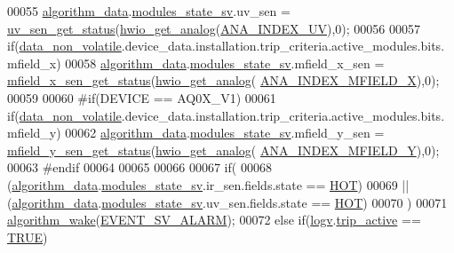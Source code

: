 \begin{DoxyCode}
00055           \hyperlink{a00016_a183caa40cd01e79ee309cc9c4a225197}{algorithm\_data}.\hyperlink{a00016_a293140e240bbd54f7601adbc9194148c}{modules\_state\_sv}.uv\_sen = 
      \hyperlink{a00020_a354d25047e79397dbe5525178f19cae0}{uv\_sen\_get\_status}(\hyperlink{a00058_a5770775aca185380868838e69ec20215}{hwio\_get\_analog}(\hyperlink{a00058_af523b82e94e382153f1313307c5bd879}{ANA\_INDEX\_UV}),0);
00056 
00057     \textcolor{keywordflow}{if}(\hyperlink{a00060_a76ac5f917f5308dcd83de0d7c94559fb}{data\_non\_volatile}.device\_data.installation.trip\_criteria.active\_modules.bits.
      mfield\_x)
00058           \hyperlink{a00016_a183caa40cd01e79ee309cc9c4a225197}{algorithm\_data}.\hyperlink{a00016_a293140e240bbd54f7601adbc9194148c}{modules\_state\_sv}.mfield\_x\_sen = 
      \hyperlink{a00019_a3a46d0e69b27b3566e6d8465cf7a8b0a}{mfield\_x\_sen\_get\_status}(\hyperlink{a00058_a5770775aca185380868838e69ec20215}{hwio\_get\_analog}(
      \hyperlink{a00058_aa797210faae0317a1b0ddace04d1257e}{ANA\_INDEX\_MFIELD\_X}),0);
00059 
00060 \textcolor{preprocessor}{  #if(DEVICE == AQ0X\_V1)}
00061     \textcolor{keywordflow}{if}(\hyperlink{a00060_a76ac5f917f5308dcd83de0d7c94559fb}{data\_non\_volatile}.device\_data.installation.trip\_criteria.active\_modules.bits.
      mfield\_y)
00062          \hyperlink{a00016_a183caa40cd01e79ee309cc9c4a225197}{algorithm\_data}.\hyperlink{a00016_a293140e240bbd54f7601adbc9194148c}{modules\_state\_sv}.mfield\_y\_sen = 
      \hyperlink{a00019_ac7134882964fedc18be6c75547987a2c}{mfield\_y\_sen\_get\_status}(\hyperlink{a00058_a5770775aca185380868838e69ec20215}{hwio\_get\_analog}(
      \hyperlink{a00058_aa2f14d4d069c5888b1d230be59751a09}{ANA\_INDEX\_MFIELD\_Y}),0);
00063 \textcolor{preprocessor}{  #endif}
00064 
00065 
00066 
00067      \textcolor{keywordflow}{if}(
00068         (\hyperlink{a00016_a183caa40cd01e79ee309cc9c4a225197}{algorithm\_data}.\hyperlink{a00016_a293140e240bbd54f7601adbc9194148c}{modules\_state\_sv}.ir\_sen.fields.state == 
      \hyperlink{a00021_a1eb14cc432874ddacd1934791dbe12a3}{HOT})
00069        || (\hyperlink{a00016_a183caa40cd01e79ee309cc9c4a225197}{algorithm\_data}.\hyperlink{a00016_a293140e240bbd54f7601adbc9194148c}{modules\_state\_sv}.uv\_sen.fields.state == 
      \hyperlink{a00021_a1eb14cc432874ddacd1934791dbe12a3}{HOT})
00070        )
00071        \hyperlink{a00016_a42ed16c7ef20e0c0031fe7ba7ae377b3}{algorithm\_wake}(\hyperlink{a00021_a0cec8cae6d70499e62b4251e5843497d}{EVENT\_SV\_ALARM});
00072      \textcolor{keywordflow}{else} \textcolor{keywordflow}{if}(\hyperlink{a00021_a2e89c46668b39a17753c238950c9e1ec}{logv}.\hyperlink{a00021_a32ebd32977bc9831cd68530b2b7ec664}{trip\_active} == \hyperlink{a00040_aa8cecfc5c5c054d2875c03e77b7be15d}{TRUE})

\end{DoxyCode}
